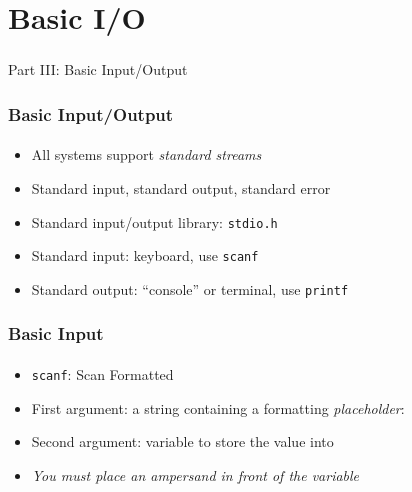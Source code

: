 \documentclass[]{beamer}
\begin{document}
\section{Basic I/O}

\begin{frame}
    \frametitle{}
    \framesubtitle{}
    
    \begin{center}
    {\Huge Part III: Basic Input/Output}\\
    {\Large }
    \end{center}

\end{frame}

\begin{frame}[fragile]
    \frametitle{Basic Input/Output}
    \framesubtitle{}

\begin{itemize}[<+->]
  \item All systems support \emph{standard streams}
  \item Standard input, standard output, standard error
  \item Standard input/output library: \texttt{stdio.h}
  \item Standard input: keyboard, use \texttt{scanf}
  \item Standard output: ``console'' or terminal, use \texttt{printf}
\end{itemize}

\end{frame}

\begin{frame}[fragile]
    \frametitle{Basic Input}
    \framesubtitle{}

\begin{itemize}[<+->]
  \item \texttt{scanf}: Scan Formatted
  \item First argument: a string containing a formatting \emph{placeholder}:
  \item Second argument: variable to store the value into
  \item \emph{You must place an ampersand in front of the variable}
\end{itemize}

\end{frame}
\end{document}
